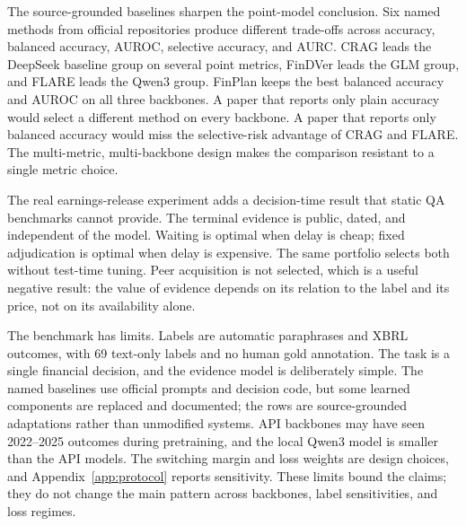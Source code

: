 \documentclass[11pt]{article}
\newcommand{\method}{FinPlan}
\begin{document}
The source-grounded baselines sharpen the point-model conclusion. Six named methods from official repositories produce different trade-offs across accuracy, balanced accuracy, AUROC, selective accuracy, and AURC. CRAG leads the DeepSeek baseline group on several point metrics, FinDVer leads the GLM group, and FLARE leads the Qwen3 group. \method{} keeps the best balanced accuracy and AUROC on all three backbones. A paper that reports only plain accuracy would select a different method on every backbone. A paper that reports only balanced accuracy would miss the selective-risk advantage of CRAG and FLARE. The multi-metric, multi-backbone design makes the comparison resistant to a single metric choice.

The real earnings-release experiment adds a decision-time result that static QA benchmarks cannot provide. The terminal evidence is public, dated, and independent of the model. Waiting is optimal when delay is cheap; fixed adjudication is optimal when delay is expensive. The same portfolio selects both without test-time tuning. Peer acquisition is not selected, which is a useful negative result: the value of evidence depends on its relation to the label and its price, not on its availability alone.

The benchmark has limits. Labels are automatic paraphrases and XBRL outcomes, with 69 text-only labels and no human gold annotation. The task is a single financial decision, and the evidence model is deliberately simple. The named baselines use official prompts and decision code, but some learned components are replaced and documented; the rows are source-grounded adaptations rather than unmodified systems. API backbones may have seen 2022--2025 outcomes during pretraining, and the local Qwen3 model is smaller than the API models. The switching margin and loss weights are design choices, and Appendix~\ref{app:protocol} reports sensitivity. These limits bound the claims; they do not change the main pattern across backbones, label sensitivities, and loss regimes.
\end{document}
